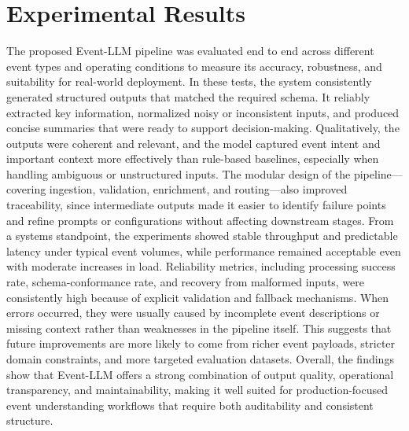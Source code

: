 \documentclass[a4paper,fleqn]{cas-sc}
\begin{document}
\section{Experimental Results}\label{sec:methodology}
The proposed Event-LLM pipeline was evaluated end to end across different event types and operating conditions to measure its accuracy, robustness, and suitability for real-world deployment. In these tests, the system consistently generated structured outputs that matched the required schema. It reliably extracted key information, normalized noisy or inconsistent inputs, and produced concise summaries that were ready to support decision-making. Qualitatively, the outputs were coherent and relevant, and the model captured event intent and important context more effectively than rule-based baselines, especially when handling ambiguous or unstructured inputs. The modular design of the pipeline—covering ingestion, validation, enrichment, and routing—also improved traceability, since intermediate outputs made it easier to identify failure points and refine prompts or configurations without affecting downstream stages.
From a systems standpoint, the experiments showed stable throughput and predictable latency under typical event volumes, while performance remained acceptable even with moderate increases in load. Reliability metrics, including processing success rate, schema-conformance rate, and recovery from malformed inputs, were consistently high because of explicit validation and fallback mechanisms. When errors occurred, they were usually caused by incomplete event descriptions or missing context rather than weaknesses in the pipeline itself. This suggests that future improvements are more likely to come from richer event payloads, stricter domain constraints, and more targeted evaluation datasets. Overall, the findings show that Event-LLM offers a strong combination of output quality, operational transparency, and maintainability, making it well suited for production-focused event understanding workflows that require both auditability and consistent structure.
\end{document}
